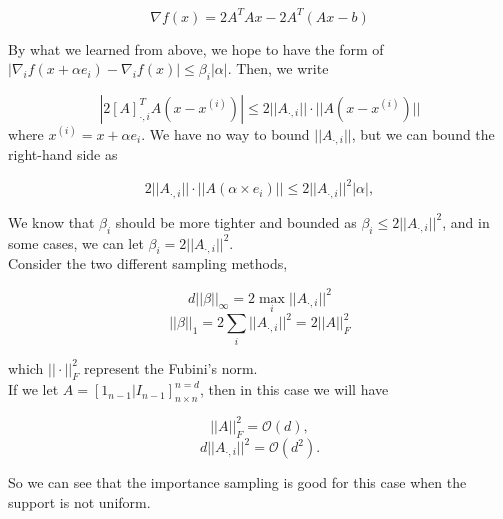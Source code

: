\documentclass[12pt]{report}
\begin{document}
$$\nabla f(x) = 2A^T Ax - 2A^T (Ax-b)$$

By what we learned from above, we hope to have the form of $|\nabla_i f(x+\alpha e_i)- \nabla_i f(x)| \leq \beta_i |\alpha|$. Then, we write

$$|2[A]^T_{\cdot,i} A(x-x^{(i)})| \leq 2||A_{\cdot, i}|| \cdot ||A(x-x^{(i)})||$$
where $x^{(i)} = x+\alpha e_i$. We have no way to bound $||A_{\cdot, i}||$, but we can bound the right-hand side as

$$2||A_{\cdot,i}|| \cdot ||A(\alpha \times e_i)|| \leq 2||A_{\cdot, i}||^2 |\alpha|,$$

We know that $\beta_i$ should be more tighter and bounded as $\beta_i \leq 2||A_{\cdot, i}||^2$, and in some cases, we can let $\beta_i = 2||A_{\cdot, i}||^2$.\\

Consider the two different sampling methods,

$$d||\beta||_{\infty} = 2\max_i ||A_{\cdot, i}||^2$$
$$||\beta||_1 = 2\sum_i ||A_{\cdot, i}||^2 = 2||A||^2_F$$

which $||\cdot||^2_F$ represent the Fubini's norm. \\


If we let $A=[1_{n-1}|I_{n-1}]_{n\times n}^{n=d}$, then in this case we will have

$$||A||^2_F = \mathcal{O} (d),$$
$$d||A_{\cdot,i}||^2 = \mathcal{O} (d^2).$$

So we can see that the importance sampling is good for this case when the support is not uniform.
\end{document}
